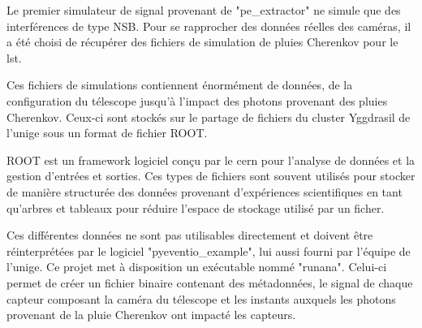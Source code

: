 Le premier simulateur de signal provenant de "pe\_extractor" ne simule que des interférences de type NSB. 
Pour se rapprocher des données réelles des caméras, il a été choisi de récupérer des fichiers de simulation de pluies Cherenkov pour le \gls{lst}.

Ces fichiers de simulations contiennent énormément de données, de la configuration du télescope jusqu'à l'impact des photons provenant des pluies Cherenkov.
Ceux-ci sont stockés sur le partage de fichiers du cluster Yggdrasil de l'\gls{unige} sous un format de fichier ROOT. 

ROOT est un framework logiciel conçu par le \gls{cern} pour l'analyse de données et la gestion d'entrées et sorties. Ces types de fichiers
sont souvent utilisés pour stocker de manière structurée des données provenant d'expériences scientifiques en tant qu'arbres et tableaux
pour réduire l'espace de stockage utilisé par un ficher.

Ces différentes données ne sont pas utilisables directement et doivent être réinterprétées par le logiciel "pyeventio\_example", lui aussi fourni
par l'équipe de l'\gls{unige}. Ce projet met à disposition un exécutable nommé "runana". Celui-ci permet de créer un fichier binaire 
contenant des métadonnées, le signal de chaque capteur composant la caméra du télescope et les instants auxquels les photons 
provenant de la pluie Cherenkov ont impacté les capteurs.

